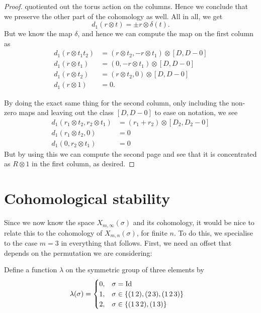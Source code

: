 \begin{proof}
  quotiented out the torus action on the columns. Hence we conclude
  that we preserve the other part of the cohomology as well. All in
  all, we get
  \[ d_1(r\otimes t) = \pm r \otimes \delta(t). \]
  But we know the map $\delta$, and hence we can compute the map on
  the first
  column as
  \begin{align*}
    d_1(r \otimes t_1t_2) &= ( r\otimes t_2, - r\otimes t_1) \otimes
    [D,D-0] \\
    d_1(r \otimes t_1) &= (0, -r\otimes t_1) \otimes [D,D-0] \\
    d_1(r \otimes t_2) &= (r\otimes t_2,0) \otimes [D,D-0] \\
    d_1(r \otimes 1) &= 0.
  \end{align*}

  By doing the exact same thing for the second column, only including
  the non-zero maps and leaving out
  the class $[D,D-0]$ to ease on notation, we see
  \begin{align*}
    d_1( r_1\otimes t_2, r_2\otimes t_1) &= (r_1 + r_2) \otimes
                                           [D_2,D_2-0] \\
    d_1( r_1 \otimes t_2, 0) &= 0 \\
    d_1( 0, r_2\otimes t_1) &= 0
  \end{align*} 
  But by using this we can compute the second page and see that it is
  concentrated as $R\otimes 1$ in the first column, as desired.
\end{proof}


\section{Cohomological stability}
\label{sec:costa}
Since we now know the space $X_{m,\infty}(\sigma)$ and its cohomology, it
would be nice to relate this to the cohomology of
$X_{m,n}(\sigma)$, for finite $n$. To do this, we specialise to the
case $m = 3$ in
everything that
follows. First, we need an offset that depends on the permutation
we are considering:
\begin{definition}
  Define a function $\lambda$ on the symmetric group of three elements
  by
  \begin{align*}
    \lambda(\sigma) &=
                      \begin{cases}
                        0, & \sigma = \operatorname{Id} \\
                        1, & \sigma \in \left\{ (1\,2),(2\,3),(1\,2\,3) \right\}
                        \\
                        2, & \sigma \in \left\{ (1\,3\,2), (1\,3) \right\}
                      \end{cases}
  \end{align*}
\end{definition}

